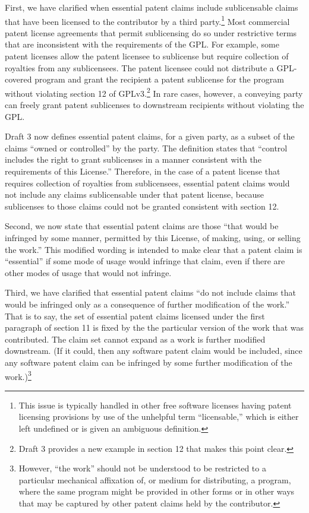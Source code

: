First, we have clarified when essential patent claims include
sublicensable claims that have been licensed to the contributor by a
third party.\footnote{This issue is typically handled in other free
software licenses having patent licensing provisions by use of the
unhelpful term ``licensable,'' which is either left undefined or is
given an ambiguous definition.}  Most commercial patent license
agreements that permit sublicensing do so under restrictive terms that
are inconsistent with the requirements of the GPL.  For example, some
patent licenses allow the patent licensee to sublicense but require
collection of royalties from any sublicensees.  The patent licensee
could not distribute a GPL-covered program and grant the recipient a
patent sublicense for the program without violating section 12 of
GPLv3.\footnote{Draft 3 provides a new example in section 12 that makes
this point clear.}  In rare cases, however, a conveying party can freely
grant patent sublicenses to downstream recipients without violating the
GPL.

Draft 3 now defines essential patent claims, for a given party, as a
subset of the claims ``owned or controlled'' by the party.  The
definition states that ``control includes the right to grant sublicenses
in a manner consistent with the requirements of this License.''
Therefore, in the case of a patent license that requires collection of
royalties from sublicensees, essential patent claims would not include
any claims sublicensable under that patent license, because sublicenses
to those claims could not be granted consistent with section 12.

Second, we now state that essential patent claims are those ``that would
be infringed by some manner, permitted by this License, of making,
using, or selling the work.'' This modified wording is intended to make
clear that a patent claim is ``essential'' if some mode of usage would
infringe that claim, even if there are other modes of usage that would
not infringe.

Third, we have clarified that essential patent claims ``do not include
claims that would be infringed only as a consequence of further
modification of the work.''  That is to say, the set of essential patent
claims licensed under the first paragraph of section 11 is fixed by the
the particular version of the work that was contributed.  The claim set
cannot expand as a work is further modified downstream.  (If it could,
then any software patent claim would be included, since any software
patent claim can be infringed by some further modification of the
work.)\footnote{However, ``the work'' should not be understood to be
restricted to a particular mechanical affixation of, or medium for
distributing, a program, where the same program might be provided in
other forms or in other ways that may be captured by other patent claims
held by the contributor.}


